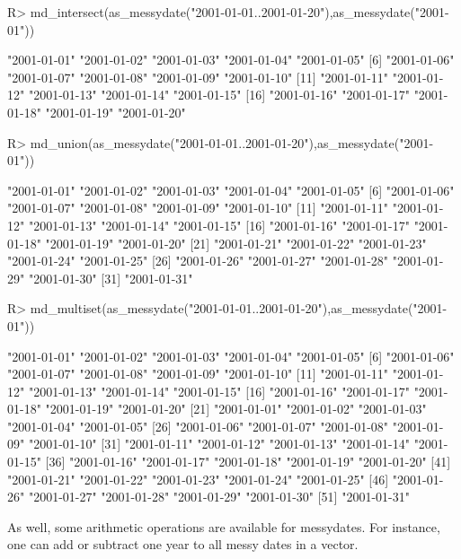 \documentclass[
]{jss}
\begin{document}
\begin{CodeChunk}
\begin{CodeInput}
R> md_intersect(as_messydate("2001-01-01..2001-01-20"),as_messydate("2001-01"))
\end{CodeInput}
\begin{CodeOutput}
 [1] "2001-01-01" "2001-01-02" "2001-01-03" "2001-01-04" "2001-01-05"
 [6] "2001-01-06" "2001-01-07" "2001-01-08" "2001-01-09" "2001-01-10"
[11] "2001-01-11" "2001-01-12" "2001-01-13" "2001-01-14" "2001-01-15"
[16] "2001-01-16" "2001-01-17" "2001-01-18" "2001-01-19" "2001-01-20"
\end{CodeOutput}
\begin{CodeInput}
R> md_union(as_messydate("2001-01-01..2001-01-20"),as_messydate("2001-01"))
\end{CodeInput}
\begin{CodeOutput}
 [1] "2001-01-01" "2001-01-02" "2001-01-03" "2001-01-04" "2001-01-05"
 [6] "2001-01-06" "2001-01-07" "2001-01-08" "2001-01-09" "2001-01-10"
[11] "2001-01-11" "2001-01-12" "2001-01-13" "2001-01-14" "2001-01-15"
[16] "2001-01-16" "2001-01-17" "2001-01-18" "2001-01-19" "2001-01-20"
[21] "2001-01-21" "2001-01-22" "2001-01-23" "2001-01-24" "2001-01-25"
[26] "2001-01-26" "2001-01-27" "2001-01-28" "2001-01-29" "2001-01-30"
[31] "2001-01-31"
\end{CodeOutput}
\begin{CodeInput}
R> md_multiset(as_messydate("2001-01-01..2001-01-20"),as_messydate("2001-01"))
\end{CodeInput}
\begin{CodeOutput}
 [1] "2001-01-01" "2001-01-02" "2001-01-03" "2001-01-04" "2001-01-05"
 [6] "2001-01-06" "2001-01-07" "2001-01-08" "2001-01-09" "2001-01-10"
[11] "2001-01-11" "2001-01-12" "2001-01-13" "2001-01-14" "2001-01-15"
[16] "2001-01-16" "2001-01-17" "2001-01-18" "2001-01-19" "2001-01-20"
[21] "2001-01-01" "2001-01-02" "2001-01-03" "2001-01-04" "2001-01-05"
[26] "2001-01-06" "2001-01-07" "2001-01-08" "2001-01-09" "2001-01-10"
[31] "2001-01-11" "2001-01-12" "2001-01-13" "2001-01-14" "2001-01-15"
[36] "2001-01-16" "2001-01-17" "2001-01-18" "2001-01-19" "2001-01-20"
[41] "2001-01-21" "2001-01-22" "2001-01-23" "2001-01-24" "2001-01-25"
[46] "2001-01-26" "2001-01-27" "2001-01-28" "2001-01-29" "2001-01-30"
[51] "2001-01-31"
\end{CodeOutput}
\end{CodeChunk}

As well, some arithmetic operations are available for messydates. For
instance, one can add or subtract one year to all messy dates in a
vector.
\end{document}
